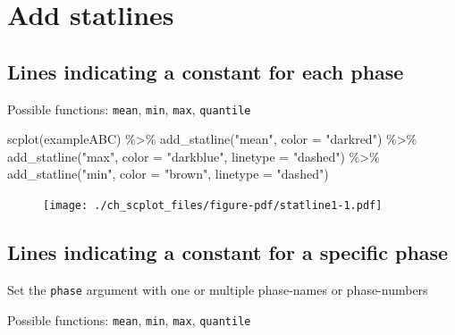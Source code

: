 \documentclass[
  letterpaper,
  DIV=11,
  numbers=noendperiod]{scrreprt}
\newenvironment{Shaded}{\begin{snugshade}}{\end{snugshade}}
\newcommand{\AttributeTok}[1]{\textcolor[rgb]{0.40,0.45,0.13}{#1}}
\newcommand{\FunctionTok}[1]{\textcolor[rgb]{0.28,0.35,0.67}{#1}}
\newcommand{\NormalTok}[1]{\textcolor[rgb]{0.00,0.23,0.31}{#1}}
\newcommand{\SpecialCharTok}[1]{\textcolor[rgb]{0.37,0.37,0.37}{#1}}
\newcommand{\StringTok}[1]{\textcolor[rgb]{0.13,0.47,0.30}{#1}}
\begin{document}
\hypertarget{add-statlines}{%
\section{Add statlines}\label{add-statlines}}

\hypertarget{lines-indicating-a-constant-for-each-phase}{%
\subsection{Lines indicating a constant for each
phase}\label{lines-indicating-a-constant-for-each-phase}}

Possible functions: \texttt{mean}, \texttt{min}, \texttt{max},
\texttt{quantile}

\begin{Shaded}
\begin{Highlighting}[]
\FunctionTok{scplot}\NormalTok{(exampleABC) }\SpecialCharTok{\%\textgreater{}\%}
  \FunctionTok{add\_statline}\NormalTok{(}\StringTok{"mean"}\NormalTok{, }\AttributeTok{color =} \StringTok{"darkred"}\NormalTok{) }\SpecialCharTok{\%\textgreater{}\%}
  \FunctionTok{add\_statline}\NormalTok{(}\StringTok{"max"}\NormalTok{, }\AttributeTok{color =} \StringTok{"darkblue"}\NormalTok{, }\AttributeTok{linetype =} \StringTok{"dashed"}\NormalTok{) }\SpecialCharTok{\%\textgreater{}\%}
  \FunctionTok{add\_statline}\NormalTok{(}\StringTok{"min"}\NormalTok{, }\AttributeTok{color =} \StringTok{"brown"}\NormalTok{, }\AttributeTok{linetype =} \StringTok{"dashed"}\NormalTok{)}
\end{Highlighting}
\end{Shaded}

\begin{figure}[H]

{\centering \texttt{[image: ./ch\_scplot\_files/figure-pdf/statline1-1.pdf]}

}

\end{figure}

\hypertarget{lines-indicating-a-constant-for-a-specific-phase}{%
\subsection{Lines indicating a constant for a specific
phase}\label{lines-indicating-a-constant-for-a-specific-phase}}

Set the \texttt{phase} argument with one or multiple phase-names or
phase-numbers

Possible functions: \texttt{mean}, \texttt{min}, \texttt{max},
\texttt{quantile}
\end{document}
